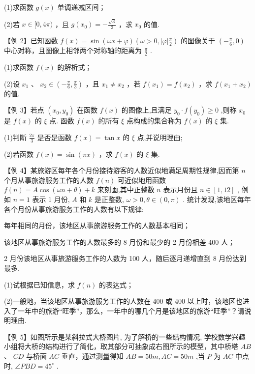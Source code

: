 (1)求函数 $g\left( x\right)$ 单调递减区间；

(2)若 $x \in  \lbrack 0,{4\pi })$ ，且 $g\left( {x}_{0}\right)  =  - \frac{\sqrt{3}}{2}$ ，求 ${x}_{0}$ 的值.

【例 2】已知函数 $f\left( x\right)  = \sin \left( {{\omega x} + \varphi }\right) \left( {\omega  > 0,\left| \varphi \right| \frac{\pi }{2}}\right)$ 的图像关于 $\left( {-\frac{\pi }{6},0}\right)$ 中心对称，且图像上相邻两个对称轴的距离为 $\frac{\pi }{2}$ .

(1)求函数 $f\left( x\right)$ 的解析式；

(2)设 ${x}_{1}$ 、 ${x}_{2} \in  \left( {-\frac{\pi }{6},\frac{\pi }{3}}\right)$ ，且 ${x}_{1} \neq  {x}_{2}$ ，若 $f\left( {x}_{1}\right)  = f\left( {x}_{2}\right)$ ，求 $f\left( {{x}_{1} + {x}_{2}}\right)$ 的值.

【例 3】若点 $\left( {{x}_{0},{y}_{0}}\right)$ 在函数 $f\left( x\right)$ 的图像上,且满足 ${y}_{0} \cdot  f\left( {y}_{0}\right)  \geq  0$ ,则称 ${x}_{0}$ 是 $f\left( x\right)$ 的 $\xi$ 点. 函数 $f\left( x\right)$ 的所有 $\xi$ 点构成的集合称为 $f\left( x\right)$ 的 $\xi$ 集.

(1)判断 $\frac{2\pi }{3}$ 是否是函数 $f\left( x\right)  = \tan x$ 的 $\xi$ 点,并说明理由;

(2)若函数 $f\left( x\right)  = \sin \left( {\pi x}\right)$ ，求 $f\left( x\right)$ 的 $\xi$ 集.

【例 4】某旅游区每年各个月份接待游客的人数近似地满足周期性规律,因而第 $n$ 个月从事旅游服务工作的人数 $f\left( n\right)$ 可近似地用函数 $f\left( n\right)  = A\cos \left( {{\omega n} + \theta }\right)  + k$ 来刻画,其中正整数 $n$ 表示月份且 $n \in  \left\lbrack  {1,{12}}\right\rbrack$ , 例如 $n = 1$ 表示 1 月份, $A$ 和 $k$ 是正整数, $\omega  > 0,\theta  \in  \left( {0,\pi }\right)$ . 统计发现,该地区每年各个月份从事旅游服务工作的人数有以下规律:

  每年相同的月份，该地区从事旅游服务工作的人数基本相同；

  该地区从事旅游服务工作的人数最多的 8 月份和最少的 2 月份相差 400 人；

  2 月份该地区从事旅游服务工作的人数为 100 人，随后逐月递增直到 8 月份达到最多.

(1)试根据已知信息，求 $f\left( n\right)$ 的表达式；

(2)一般地，当该地区从事旅游服务工作的人数在 400 或 400 以上时，该地区也进入了一年中的旅游“旺季”，那么，一年中的哪几个月是该地区的旅游“旺季”？请说明理由.

【例 5】如图所示是某斜拉式大桥图片, 为了解桥的一些结构情况, 学校数学兴趣小组将大桥的结构进行了简化，取其部分可抽象成右图所示的模型，其中桥塔 ${AB}$ 、 ${CD}$ 与桥面 ${AC}$ 垂直，通过测量得知 ${AB} =  {50}{m},{AC} = {50}{m}$ ,当 $P$ 为 ${AC}$ 中点时, $\angle {PBD} = {45}^{ \circ  }$ .

